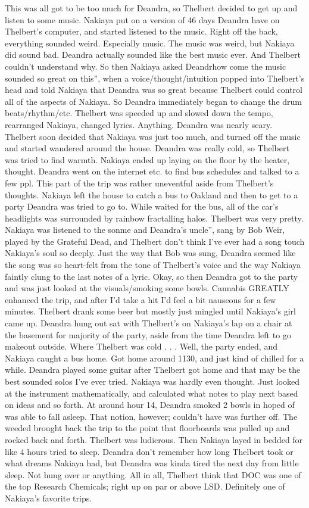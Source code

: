 \documentclass[12pt]{book}
\begin{document}
This was all got to be too much for Deandra, so Thelbert decided to get up and listen to some music. Nakiaya put on a version of 46 days Deandra have on Thelbert's computer, and started listened to the music. Right off the back, everything sounded weird. Especially music. The music was weird, but Nakiaya did sound bad. Deandra actually sounded like the best music ever. And Thelbert couldn't understand why. So then Nakiaya asked Deandrhow come the music sounded so great on this'', when a voice/thought/intuition popped into Thelbert's head and told Nakiaya that Deandra was so great because Thelbert could control all of the aspects of Nakiaya. So Deandra immediately began to change the drum beats/rhythm/etc. Thelbert was speeded up and slowed down the tempo, rearranged Nakiaya, changed lyrics. Anything. Deandra was nearly scary. Thelbert soon decided that Nakiaya was just too much, and turned off the music and started wandered around the house. Deandra was really cold, so Thelbert was tried to find warmth. Nakiaya ended up laying on the floor by the heater, thought. Deandra went on the internet etc. to find bus schedules and talked to a few ppl. This part of the trip was rather uneventful aside from Thelbert's thoughts. Nakiaya left the house to catch a bus to Oakland and then to get to a party Deandra was tried to go to. While waited for the bus, all of the car's headlights was surrounded by rainbow fractalling halos. Thelbert was very pretty. Nakiaya was listened to the sonme and Deandra's uncle'', sang by Bob Weir, played by the Grateful Dead, and Thelbert don't think I've ever had a song touch Nakiaya's soul so deeply. Just the way that Bob was sung, Deandra seemed like the song was so heart-felt from the tone of Thelbert's voice and the way Nakiaya faintly clung to the last notes of a lyric. Okay, so then Deandra got to the party and was just looked at the visuals/smoking some bowls. Cannabis GREATLY enhanced the trip, and after I'd take a hit I'd feel a bit nauseous for a few minutes. Thelbert drank some beer but mostly just mingled until Nakiaya's girl came up. Deandra hung out sat with Thelbert's on Nakiaya's lap on a chair at the basement for majority of the party, aside from the time Deandra left to go makeout outside. Where Thelbert was cold . . .  Well, the party ended, and Nakiaya caught a bus home. Got home around 1130, and just kind of chilled for a while. Deandra played some guitar after Thelbert got home and that may be the best sounded solos I've ever tried. Nakiaya was hardly even thought. Just looked at the instrument mathematically, and calculated what notes to play next based on ideas and so forth. At around hour 14, Deandra smoked 2 bowls in hoped of was able to fall asleep. That notion, however; couldn't have was further off. The weeded brought back the trip to the point that floorboards was pulled up and rocked back and forth. Thelbert was ludicrous. Then Nakiaya layed in bedded for like 4 hours tried to sleep. Deandra don't remember how long Thelbert took or what dreams Nakiaya had, but Deandra was kinda tired the next day from little sleep. Not hung over or anything. All in all, Thelbert think that DOC was one of the top Research Chemicals; right up on par or above LSD. Definitely one of Nakiaya's favorite trips.
\end{document}
